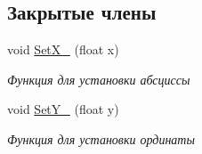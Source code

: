 \subsection*{Закрытые члены}
\begin{DoxyCompactItemize}
\item 
void \hyperlink{classrtm_1_1_coating_object_a5bb5e11400d05dc2d50bfbd2021d3aac}{Set\+X\+\_\+} (float x)
\begin{DoxyCompactList}\small\item\em Функция для установки абсциссы \end{DoxyCompactList}\item 
void \hyperlink{classrtm_1_1_coating_object_a3f67f750f8bf4b87a55655018c0c8d71}{Set\+Y\+\_\+} (float y)
\begin{DoxyCompactList}\small\item\em Функция для установки ординаты \end{DoxyCompactList}\end{DoxyCompactItemize}
